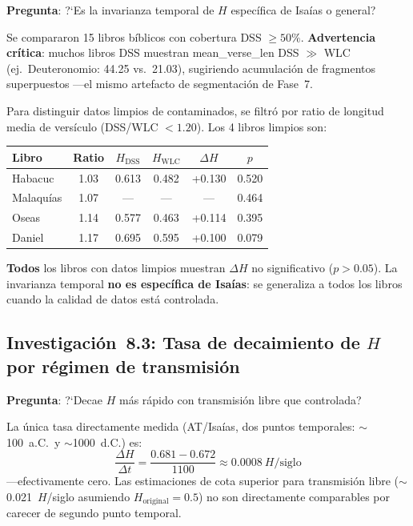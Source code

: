 \documentclass[12pt,a4paper]{article}
\begin{document}
\noindent\textbf{Pregunta}: ?`Es la invarianza temporal de $H$ espec\'ifica de Isa\'ias
o general?

Se compararon 15 libros b\'iblicos con cobertura DSS $\geq 50\%$.
\textbf{Advertencia cr\'itica}: muchos libros DSS muestran mean\_verse\_len
DSS $\gg$ WLC (ej.\ Deuteronomio: 44.25 vs.\ 21.03), sugiriendo acumulaci\'on de
fragmentos superpuestos ---el mismo artefacto de segmentaci\'on de Fase~7.

Para distinguir datos limpios de contaminados, se filtr\'o por ratio de longitud
media de vers\'iculo (DSS/WLC $< 1.20$). Los 4 libros limpios son:

\begin{center}
\begin{tabular}{lccccc}
\toprule
\textbf{Libro} & \textbf{Ratio} & \textbf{$H_{\text{DSS}}$} & \textbf{$H_{\text{WLC}}$} & \textbf{$\Delta H$} & \textbf{$p$} \\
\midrule
Habacuc    & 1.03 & 0.613 & 0.482 & +0.130 & 0.520 \\
Malaqu\'ias & 1.07 & ---   & ---   & ---    & 0.464 \\
Oseas      & 1.14 & 0.577 & 0.463 & +0.114 & 0.395 \\
Daniel     & 1.17 & 0.695 & 0.595 & +0.100 & 0.079 \\
\bottomrule
\end{tabular}
\end{center}

\noindent
\textbf{Todos} los libros con datos limpios muestran $\Delta H$ no significativo
($p > 0.05$). La invarianza temporal \textbf{no es espec\'ifica de Isa\'ias}:
se generaliza a todos los libros cuando la calidad de datos est\'a controlada.

\subsection{Investigaci\'on~8.3: Tasa de decaimiento de $H$ por r\'egimen de transmisi\'on}

\noindent\textbf{Pregunta}: ?`Decae $H$ m\'as r\'apido con transmisi\'on libre que controlada?

La \'unica tasa directamente medida (AT/Isa\'ias, dos puntos temporales:
$\sim$100~a.C.\ y $\sim$1000~d.C.) es:
\[
\frac{\Delta H}{\Delta t} = \frac{0.681 - 0.672}{1100} \approx 0.0008~H/\text{siglo}
\]
---efectivamente cero. Las estimaciones de cota superior para transmisi\'on libre
($\sim$0.021~$H$/siglo asumiendo $H_{\text{original}} = 0.5$) no son directamente
comparables por carecer de segundo punto temporal.
\end{document}
